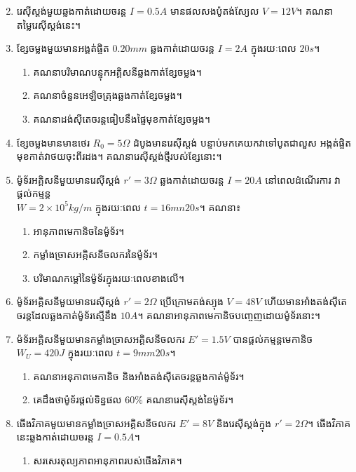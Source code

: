 \begin{enumerate}
\begin{multicols}{2}
\begin{figure}[H]
\begin{circuitikz}
			\end{circuitikz}
		\end{figure}
	\end{multicols}
	\item រេស៊ីស្តង់មួយឆ្លងកាត់ដោយចរន្ត $I=0.5A$ មានផលសងប៉ូតង់ស្យែល $V=12V$។ គណនាតម្លៃរេស៊ីស្តង់នេះ។
	\item ខ្សែចម្លងមួយមានអង្គត់ផ្ចិត $0.20mm$ ឆ្លងកាត់ដោយចរន្ត $I=2A$ ក្នុងរយៈពេល $20s$។
	\begin{enumerate}[k]
		\item គណនាបរិមាណបន្ទុកអគ្គិសនីឆ្លងកាត់ខ្សែចម្លង។
		\item គណនាចំនួនអេឡិចត្រុងឆ្លងកាត់ខ្សែចម្លង។
		\item គណនាដង់ស៊ីតេចរន្តធៀបនឹងផ្ទៃមុខកាត់ខ្សែចម្លង។
	\end{enumerate}
	\item ខ្សែចម្លងមានមាឌថេរ $R_{0}=5\Omega$ ដំបូងមានរេស៊ីស្តង់ បន្ទាប់មកគេយកវាទៅបូតជាលួស អង្កត់ផ្ចិតមុខកាត់វាថយចុះពីរដង។ គណនារេស៊ីស្តង់ថ្មីរបស់ខ្សែនោះ។
	\item ម៉ូទ័រអគ្គិសនីមួយមានរេស៊ីស្តង់ $r'=3\Omega$ ឆ្លងកាត់ដោយចរន្ត $I=20A$ នៅពេលដំណើរការ វាផ្តល់កម្មន្ត\\ $W=2\times10^{5}kg/m$ ក្នុងរយៈពេល $t=16mn20s$។ គណនា៖
	\begin{enumerate}[k,2]
		\item អានុភាពមេកានិចនៃម៉ូទ័រ។
		\item កម្លាំងច្រាសអគ្កិសនីចលករនៃម៉ូទ័រ។
		\item បរិមាណកម្តៅនៃម៉ូទ័រក្នុងរយៈពេលខាងលើ។
	\end{enumerate}
	\item ម៉ូទ័រអគ្គិសនីមួយមានរេស៊ីស្តង់ $r'=2\Omega$ ប្រើក្រោមតង់ស្យុង $V=48V$ ហើយមានអាំងតង់ស៊ីតេចរន្តដែលឆ្លងកាត់ម៉ូទ័រស្មើនឹង $10A$។ គណនាអានុភាពមេកានិចបញ្ចេញដោយម៉ូទ័រនោះ។
	\item ម៉ទ័រអគ្គិសនីមួយមានកម្លាំងច្រាសអគ្គិសនីចលករ $E'=1.5V$ បានផ្តល់កម្មន្តមេកានិច $W_{U}=420J$ ក្នុងរយៈពេល $t=9mm20s$។
	\begin{enumerate}
		\item គណនាអនុភាពមេកានិច និងអាំងតង់សុីតេចរន្តឆ្លងកាត់ម៉ូទ័រ។
		\item គេដឹងថាម៉ូទ័រផ្តល់ទិន្នផល $60\%$ គណនារេស៊ីស្តង់នៃម៉ូទ័រ។
	\end{enumerate}
	\item ផើងវិភាគមួយមានកម្លាំងច្រាសអគ្គិសនីចលករ $E'=8V$ និងរេស៊ីស្តង់ក្នុង $r'=2\Omega$។ ផើងវិភាគនេះឆ្លងកាត់ដោយចរន្ត $I=0.5A$។
	\begin{enumerate}[k,2]
		\item សរសេរតុល្យភាពអានុភាពរបស់ផើងវិភាគ។

\end{enumerate}
\end{enumerate}
